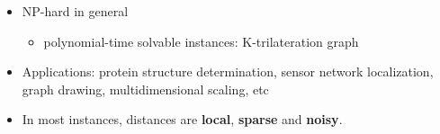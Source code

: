 \documentclass[hyperref={pdfpagelabels=false},table,9pt,compress]{beamer}
\begin{document}
\begin{CJK*}{GBK}{kai}
{\begin{itemize}
  \item NP-hard in general
    \begin{itemize}
      \item polynomial-time solvable instances: K-trilateration graph %
    \end{itemize}
  \item Applications: protein structure determination, sensor network localization, graph drawing, multidimensional scaling, etc
      \vskip-3mm
      \begin{figure}
        \centering
        \hspace{5mm}
        \hspace{5mm}
      \end{figure}
  \item In most instances, distances are \textbf{local}, \textbf{sparse} and \textbf{noisy}.
\end{itemize}
}
%



\end{CJK*}
\end{document}
